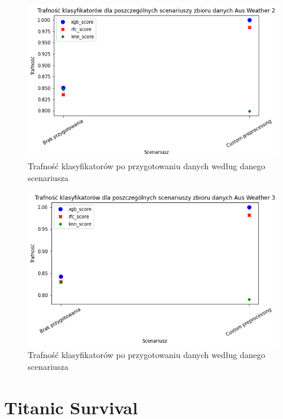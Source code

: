 \documentclass{book}
\begin{document}
\begin{figure}[H]
\centerline{\includegraphics[scale=0.5]{Aus_Weather_2_Custom}}
\centering
\caption{Trafność klasyfikatorów po przygotowaniu danych 
według danego scenariusza}
\end{figure}

\begin{figure}[H]
\centerline{\includegraphics[scale=0.5]{Aus_Weather_3_Custom}}
\centering
\caption{Trafność klasyfikatorów po przygotowaniu danych 
według danego scenariusza}
\end{figure}


\section{Titanic Survival}
\end{document}
